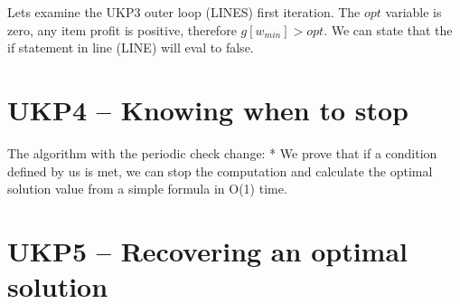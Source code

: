 \documentclass[12pt]{article}
\begin{document}
Lets examine the UKP3 outer loop (LINES) first iteration. The \(opt\) variable is zero, any item profit is positive, therefore \(g[w_{min}] > opt\). We can state that the if statement in line (LINE) will eval to false.

\section{UKP4 -- Knowing when to stop}
The algorithm with the periodic check change:
	* We prove that if a condition defined by us is met, we can stop the computation and calculate the optimal solution value from a simple formula in O(1) time.

\section{UKP5 -- Recovering an optimal solution}
\end{document}
